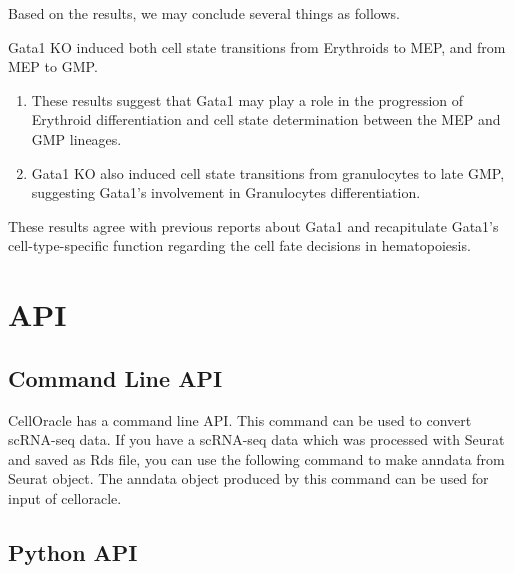 \documentclass[letterpaper,10pt,english]{sphinxmanual}
\begin{document}
Based on the results, we may conclude several things as follows.

Gata1 KO induced both cell state transitions from Erythroids to MEP, and from MEP to GMP.
\begin{enumerate}
\def\theenumi{\arabic{enumi}}
\def\labelenumi{(\theenumi )}
\makeatletter\def\p@enumii{\p@enumi (\theenumi )}\makeatother
\item {} 
These results suggest that Gata1 may play a role in the progression of Erythroid differentiation and cell state determination between the MEP and GMP lineages.

\item {} 
Gata1 KO also induced cell state transitions from granulocytes to late GMP, suggesting Gata1’s involvement in Granulocytes differentiation.

\end{enumerate}

These results agree with previous reports about Gata1 and recapitulate Gata1’s cell-type-specific function regarding the cell fate decisions in hematopoiesis.


\section{API}
\label{\detokenize{modules/index:api}}\label{\detokenize{modules/index::doc}}

\subsection{Command Line API}
\label{\detokenize{modules/index:command-line-api}}
CellOracle has a command line API.
This command can be used to convert scRNA-seq data.
If you have a scRNA-seq data which was processed with Seurat and saved as Rds file, you can use the following command to make anndata from Seurat object.
The anndata object produced by this command can be used for input of celloracle.

\begin{sphinxVerbatim}[commandchars=\\\{\}]
  
\end{sphinxVerbatim}


\subsection{Python API}
\label{\detokenize{modules/index:python-api}}
\end{document}

